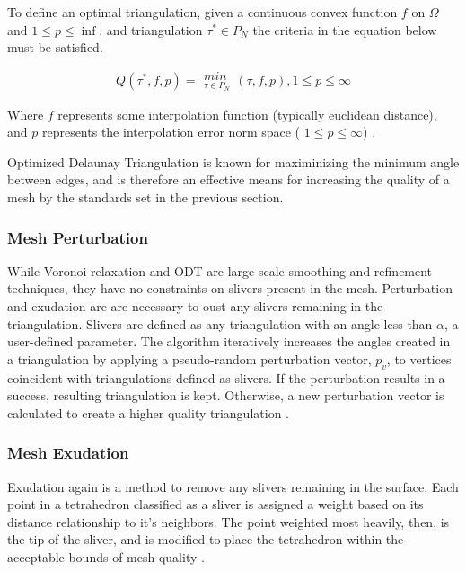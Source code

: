 \documentclass[12pt]{drexelthesis}
\let\Oldsubsubsection\subsubsection
\renewcommand{\subsubsection}{\FloatBarrier\Oldsubsubsection}
\begin{document}
To define an optimal triangulation, given a continuous convex function $f$ on $\Omega$ and $1 \leq p \leq \inf$, and triangulation $\tau^{\ast} \in P_{N}$  the criteria in the equation below must be satisfied.

\begin{equation}
	Q ( \tau^{\ast}  , f, p) = \substack{min \\ _{\tau \in P_{N}} } (\tau , f, p), 1 \leq p \leq \infty
\end{equation}

Where $f$ represents some interpolation function (typically euclidean distance), and $p$ represents the interpolation error norm space ( $1 \leq p \leq \infty$) \cite{ODT}.

Optimized Delaunay Triangulation is known for maximinizing the minimum angle between edges, and is therefore an effective means for increasing the quality of a mesh by the standards set in the previous section.

\subsubsection{Mesh Perturbation}
While  Voronoi  relaxation  and  ODT  are  large  scale  smoothing  and  refinement  techniques,  they  have  no  constraints  on  slivers  present  in  the  mesh.  Perturbation  and  exudation  are  are  necessary  to  oust  any  slivers  remaining  in  the  triangulation.  Slivers  are  defined  as  any  triangulation  with  an  angle  less  than  $\alpha$,  a  user-defined  parameter.  The  algorithm  iteratively  increases  the  angles  created  in  a  triangulation  by  applying  a  pseudo-random  perturbation  vector,  $p_{v}$,  to  vertices  coincident  with  triangulations  defined  as  slivers.  If  the  perturbation  results  in  a  success,  resulting  triangulation  is  kept.  Otherwise,  a  new  perturbation  vector  is  calculated  to  create  a  higher  quality  triangulation  \cite{RN63}. 

\subsubsection{Mesh Exudation}
Exudation  again  is  a  method  to  remove  any  slivers  remaining  in  the  surface.  Each  point  in  a  tetrahedron  classified  as  a  sliver  is  assigned  a  weight  based  on  its distance  relationship  to  it’s  neighbors.  The  point  weighted  most  heavily,  then,  is  the  tip  of  the  sliver,  and  is  modified  to  place  the  tetrahedron  within  the  acceptable  bounds  of  mesh  quality  \cite{RN64}. %
\end{document}
